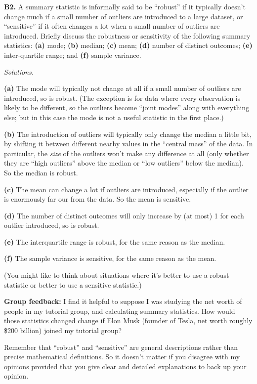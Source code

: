 \documentclass[
  a4paper,
]{book}
\theoremstyle{definition}
\theoremstyle{definition}
\theoremstyle{definition}
\theoremstyle{definition}
\theoremstyle{remark}
\begin{document}
\textbf{B2.} A summary statistic is informally said to be ``robust'' if it typically doesn't change much if a small number of outliers are introduced to a large dataset, or ``sensitive'' if it often changes a lot when a small number of outliers are introduced. Briefly discuss the robustness or sensitivity of the following summary statistics: \textbf{(a)} mode; \textbf{(b)} median; \textbf{(c)} mean; \textbf{(d)} number of distinct outcomes; \textbf{(e)} inter-quartile range; and \textbf{(f)} sample variance.

\begin{myanswers}
\emph{Solutions.}

\textbf{(a)} The mode will typically not change at all if a small number of outliers are introduced, so is robust. (The exception is for data where every observation is likely to be different, so the outliers become ``joint modes'' along with everything else; but in this case the mode is not a useful statistic in the first place.)

\textbf{(b)} The introduction of outliers will typically only change the median a little bit, by shifting it between different nearby values in the ``central mass'' of the data. In particular, the \emph{size} of the outliers won't make any difference at all (only whether they are ``high outliers'' above the median or ``low outliers'' below the median). So the median is robust.

\textbf{(c)} The mean can change a lot if outliers are introduced, especially if the outlier is enormously far our from the data. So the mean is sensitive.

\textbf{(d)} The number of distinct outcomes will only increase by (at most) 1 for each outlier introduced, so is robust.

\textbf{(e)} The interquartile range is robust, for the same reason as the median.

\textbf{(f)} The sample variance is sensitive, for the same reason as the mean.

(You might like to think about situations where it's better to use a robust statistic or better to use a sensitive statistic.)

\textbf{Group feedback:} I find it helpful to suppose I was studying the net worth of people in my tutorial group, and calculating summary statistics. How would those statistics changed change if Elon Musk (founder of Tesla, net worth roughly \$200 billion) joined my tutorial group?

Remember that ``robust'' and ``sensitive'' are general descriptions rather than precise mathematical definitions. So it doesn't matter if you disagree with my opinions provided that you give clear and detailed explanations to back up your opinion.

\end{myanswers}
\end{document}
